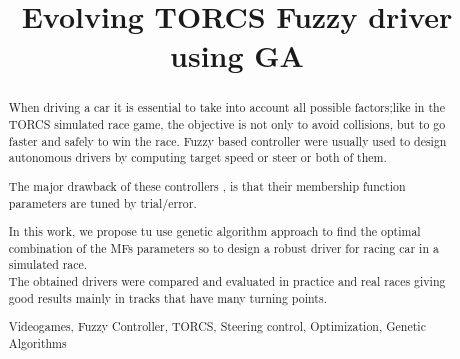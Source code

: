 \documentclass[runningheads,a4paper]{llncs}
\newcommand{\keywords}[1]{\par\addvspace\baselineskip
	\noindent\keywordname\enspace\ignorespaces#1}
\begin{document}
	
	\mainmatter  %
	
	\title{Evolving TORCS Fuzzy driver using GA}
	
	
	
	
	
	
	
	
	
	
	
	
	\tocauthor{}
	\maketitle
	\begin{abstract}
		
		When driving a car it is essential to take into account all possible
		factors;like in the TORCS simulated race game, the
		objective is not only to avoid collisions, but to go faster and safely to win the race. Fuzzy based controller were usually used to design autonomous drivers by computing target speed or steer or both of them.
		
		The major drawback of these controllers , is that their membership function parameters are tuned by trial/error.
		
		In this work, we propose tu use genetic algorithm approach to find the optimal combination of the MFs parameters so to design a robust driver for racing car in a simulated race.\\
		The obtained drivers were compared and  evaluated in practice and real races
		giving good results mainly in tracks that have many turning points.
	\keywords{Videogames, Fuzzy Controller, TORCS, Steering control, Optimization, Genetic Algorithms}
	\end{abstract}
	
\end{document}
